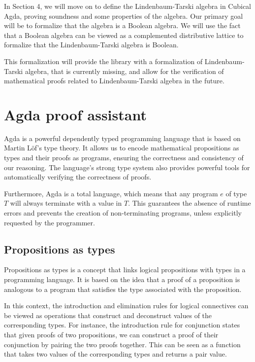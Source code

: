\documentclass[titlepage]{article}
\begin{document}
In Section 4, we will move on to define the Lindenbaum-Tarski algebra in Cubical Agda, proving soundness and some properties of the algebra. Our primary goal will be to formalize that the algebra is a Boolean algebra. We will use the fact that a Boolean algebra can be viewed as a complemented distributive lattice to formalize that the Lindenbaum-Tarski algebra is Boolean.

This formalization will provide the \agdaCubical library with a formalization of Lindenbaum-Tarski algebra, that is currently missing, and allow for the verification of mathematical proofs related to Lindenbaum-Tarski algebra in the future.




\section{Agda proof assistant}

Agda is a powerful dependently typed programming language that is based on Martin Löf's type theory. It allows us to encode mathematical propositions as types and their proofs as programs, ensuring the correctness and consistency of our reasoning. The language's strong type system also provides powerful tools for automatically verifying the correctness of proofs.\cite{BoveDybjer2008}

Furthermore, Agda is a total language, which means that any program $e$ of type $T$ will always terminate with a value in $T$. This guarantees the absence of runtime errors and prevents the creation of non-terminating programs, unless explicitly requested by the programmer.\cite{AgdaDoc}


\subsection{Propositions as types}

Propositions as types is a concept that links logical propositions with types in a programming language. It is based on the idea that a proof of a proposition is analogous to a program that satisfies the type associated with the proposition.

In this context, the introduction and elimination rules for logical connectives can be viewed as operations that construct and deconstruct values of the corresponding types. For instance, the introduction rule for conjunction states that given proofs of two propositions, we can construct a proof of their conjunction by pairing the two proofs together. This can be seen as a function that takes two values of the corresponding types and returns a pair value.
\end{document}

